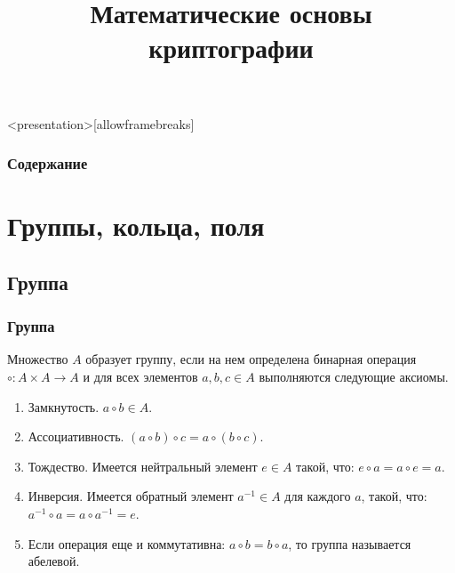 
\title[Математические основы криптографии]{Математические основы криптографии}







\begin{frame}<presentation>[allowframebreaks]
\frametitle{Содержание}
\tableofcontents
\end{frame}


\section{Группы, кольца, поля}


\subsection{Группа}


\begin{frame}
    \frametitle{Группа}
    \begin{definition}
        Множество $A$ образует \alert{группу}, если на нем определена бинарная операция $\circ:A\times A\to A$ и для всех элементов $a,b,c\in A$ выполняются следующие аксиомы.
        \begin{enumerate}
            \item \label{en:groupClosure}\alert{Замкнутость}. $a \circ b \in A$.
            \item \label{en:groupAssoc}\alert{Ассоциативность}. $(a \circ b) \circ c =  a \circ (b \circ c)$.
            \item \label{en:groupNeytral} \alert{Тождество}. Имеется \alert{нейтральный} элемент $e\in A$ такой, что: $e \circ a = a \circ e = a$.
            \item \label{en:groupNegative} \alert{Инверсия}. Имеется \alert{обратный} элемент $a^{-1}\in A$ для каждого $a$, такой, что: $a^{-1} \circ a = a \circ a^{-1} = e$.
            \item<2-> Если операция еще и \alert{коммутативна}: $a \circ b = b \circ a$, то группа называется \alert{абелевой}.
        \end{enumerate}
    \end{definition}
\end{frame}

